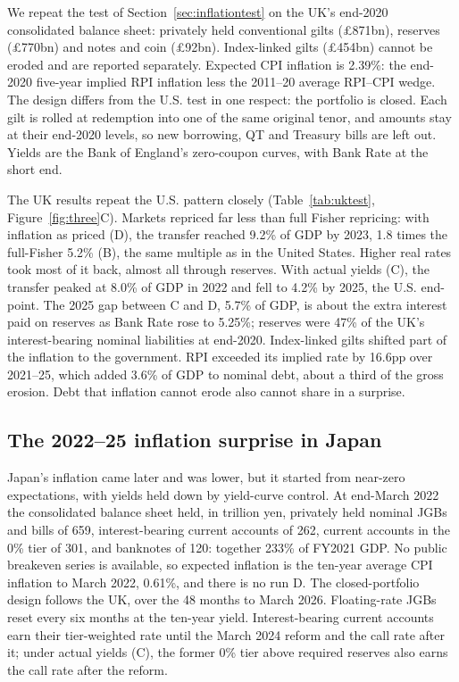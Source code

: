 We repeat the test of Section~\ref{sec:inflationtest} on the UK's end-2020 consolidated balance sheet: privately held conventional gilts (\pounds871bn), reserves (\pounds770bn) and notes and coin (\pounds92bn). Index-linked gilts (\pounds454bn) cannot be eroded and are reported separately. Expected CPI inflation is 2.39\%: the end-2020 five-year implied RPI inflation less the 2011--20 average RPI--CPI wedge. The design differs from the U.S. test in one respect: the portfolio is closed. Each gilt is rolled at redemption into one of the same original tenor, and amounts stay at their end-2020 levels, so new borrowing, QT and Treasury bills are left out. Yields are the Bank of England's zero-coupon curves, with Bank Rate at the short end.



The UK results repeat the U.S. pattern closely (Table~\ref{tab:uktest}, Figure~\ref{fig:three}C). Markets repriced far less than full Fisher repricing: with inflation as priced (D), the transfer reached 9.2\% of GDP by 2023, 1.8 times the full-Fisher 5.2\% (B), the same multiple as in the United States. Higher real rates took most of it back, almost all through reserves. With actual yields (C), the transfer peaked at 8.0\% of GDP in 2022 and fell to 4.2\% by 2025, the U.S. end-point. The 2025 gap between C and D, 5.7\% of GDP, is about the extra interest paid on reserves as Bank Rate rose to 5.25\%; reserves were 47\% of the UK's interest-bearing nominal liabilities at end-2020. Index-linked gilts shifted part of the inflation to the government. RPI exceeded its implied rate by 16.6pp over 2021--25, which added 3.6\% of GDP to nominal debt, about a third of the gross erosion. Debt that inflation cannot erode also cannot share in a surprise.

\subsection{The 2022--25 inflation surprise in Japan}\label{sec:jptest}

Japan's inflation came later and was lower, but it started from near-zero expectations, with yields held down by yield-curve control. At end-March 2022 the consolidated balance sheet held, in trillion yen, privately held nominal JGBs and bills of 659, interest-bearing current accounts of 262, current accounts in the 0\% tier of 301, and banknotes of 120: together 233\% of FY2021 GDP. No public breakeven series is available, so expected inflation is the ten-year average CPI inflation to March 2022, 0.61\%, and there is no run D. The closed-portfolio design follows the UK, over the 48 months to March 2026. Floating-rate JGBs reset every six months at the ten-year yield. Interest-bearing current accounts earn their tier-weighted rate until the March 2024 reform and the call rate after it; under actual yields (C), the former 0\% tier above required reserves also earns the call rate after the reform.

